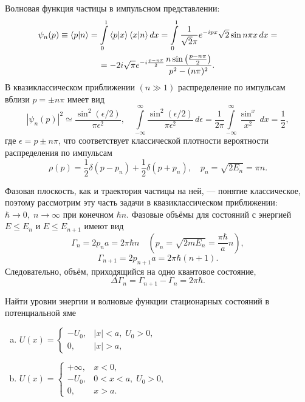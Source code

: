 \documentclass[a4paper]{article}
\begin{document}
\begin{sol}
Волновая функция частицы в импульсном представлении:
\begin{multline*}
	\psi_n(p)\equiv \braket{p |n}=
	\int\limits_{0}^{1} \braket{p |x} \braket{x |n}dx=
	\int\limits_{0}^{1} \frac{1}{\sqrt{2} \pi}
	e^{-ipx}\sqrt{2} \sin n \pi x\, dx=\\=
	- 2i\sqrt{\pi} e^{-i \frac{p-n\pi}{2}} \frac{
	n \sin \left( \frac{p-n\pi}{2} \right) }{p^2-(n\pi)^2}
.\end{multline*} 
В квазиклассическом приближении $(n\gg 1)$ распределение по
импульсам вблизи $p =\pm n \pi $ имеет вид
\[
	\left| \psi_n (p)\right|^2 \simeq \frac{
	\sin^2 (\epsilon /2)}{\pi \epsilon^2},\quad
	\int\limits_{-\infty}^{\infty} \frac{\sin^2(\epsilon /2)}{
	\pi \epsilon^2}\,d\epsilon =
	\frac{1}{2\pi}\int\limits_{-\infty}^{\infty} \frac{
	\sin^x}{x^2}\,dx=\frac{1}{2} ,
\] 
где $\epsilon= p \pm n \pi$, что соответствует классической
плотности вероятности распределения по импульсам
\[
	\rho(p)= \frac{1}{2} \delta (p-p_n)+\frac{1}{2}\delta
	(p+p_n),\quad p_n = \sqrt{2 E_n} = \pi n
.\] 

Фазовая плоскость, как и траектория частицы на ней, --- понятие
классическое, поэтому рассмотрим эту часть задачи в
квазиклассическом приближении: $\hbar\to 0,\; n\to \infty$ при
конечном $\hbar n$. Фазовые объёмы для состояний с энергией
$E\le E_n$ и $E\le E_{n+1}$ имеют вид
\[
	\Gamma_n= 2 p_n a = 2\pi \hbar n \quad \left( 
	p_n = \sqrt{2 m E_n} =\frac{\pi \hbar }{a}n\right) ,
\]
\[
	\Gamma_{n+1}= 2 p_{n+1}a = 2\pi \hbar (n+1)
.\] 
Следовательно, объём, приходящийся на одно квантовое состояние,
\[
\Delta \Gamma_n= \Gamma_{n+1}-\Gamma_n=2\pi \hbar
.\] 
\end{sol}
\begin{problem}
\label{prob:2}
	Найти уровни энергии и волновые функции стационарных
	состояний в потенциальной яме
	\begin{enumerate}[a)]
		\item $U(x)= \begin{cases}
				-U_0, & |x|<a,\; U_0
				>0,\\
				0, & |x|
				>a,
		\end{cases}$
	\item $U(x)=
		\begin{cases}
			+\infty,& x<0,\\
			-U_0, & 0<x<a,\; U_0>0,\\
			0,& x>a.
		\end{cases}$
	\end{enumerate}
\end{problem}
\end{document}
